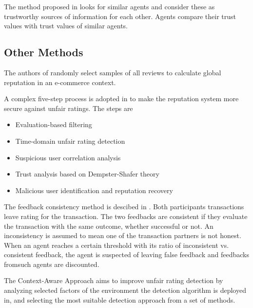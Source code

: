 \documentclass[%
    ]{\PathToTumTemplate/thesis/tum_thesis}
\begin{document}
The method proposed in \cite{zupancic_qade_2015} looks for similar agents and consider these as trustworthy sources of information for each other.
Agents compare their trust values with trust values of similar agents.


\subsection{Other Methods}

The authors of \cite{rezvani_randomized_2020} randomly select samples of all reviews to calculate global reputation in an e-commerce context.

A complex five-step process is adopted in \cite{baby_secure_2014} to make the reputation system more secure against unfair ratings.
The steps are
\begin{itemize}
\item Evaluation-based filtering
\item Time-domain unfair rating detection
\item Suspicious user correlation analysis
\item Trust analysis based on Dempster-Shafer theory
\item Malicious user identification and reputation recovery
\end{itemize}


The feedback consistency method is descibed in \cite{azzedin_identifying_2010}.
Both participants transactions leave rating for the transaction.
The two feedbacks are consistent if they evaluate the transaction with the same outcome, whether successful or not.
An inconsistency is assumed to mean one of the transaction partners is not honest.
When an agent reaches a certain threshold with its ratio of inconsistent vs. consistent feedback, the agent is suspected of leaving false feedback and feedbacks fromsuch agents are discounted.

The Context-Aware Approach aims to improve unfair rating detection by analyzing selected factors of the environment the detection algorithm is deployed in, and selecting the most suitable detection approach from a set of methods\cite{wan_context-aware_2012}.
\end{document}
